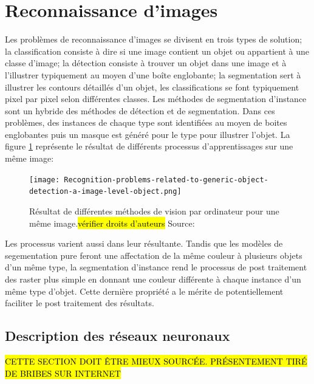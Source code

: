 \section{Reconnaissance d'images}
Les problèmes de reconnaissance d'images se divisent en trois types de solution; la classification consiste à dire si une image contient un objet ou appartient à une classe d'image; la détection consiste à trouver un objet dans une image et à l'illustrer typiquement au moyen d'une boîte englobante; la segmentation sert à illustrer les contours détaillés d'un objet, les classifications se font typiquement pixel par pixel selon différentes classes. Les méthodes de segmentation d'instance sont un hybride des méthodes de détection et de segmentation. Dans ces problèmes, des instances de chaque type sont identifiées au moyen de boites englobantes puis un masque est généré pour le type pour illustrer l'objet. La figure \ref{fig:computer_vision_problems} représente le résultat de différents processus d'apprentissages sur une même image:

\begin{figure}[!h]
  \centering
  \texttt{[image: Recognition-problems-related-to-generic-object-detection-a-image-level-object.png]}
  \caption{Résultat de différentes méthodes de vision par ordinateur pour une même image.\hl{vérifier droits d'auteurs} Source: \cite{Minaee:ImageSegmentation:2022}}
  \label{fig:computer_vision_problems}
\end{figure}
Les processus varient aussi dans leur résultante. Tandis que les modèles de segementation pure feront une affectation de la même couleur à plusieurs objets d'un même type, la segmentation d'instance rend le processus de post traitement des raster plus simple en donnant une couleur différente à chaque instance d'un même type d'objet. Cette dernière propriété a le mérite de potentiellement faciliter le post traitement des résultats.

\subsection{Description des réseaux neuronaux}
\hl{CETTE SECTION DOIT ÊTRE MIEUX SOURCÉE. PRÉSENTEMENT TIRÉ DE BRIBES SUR INTERNET}\par
